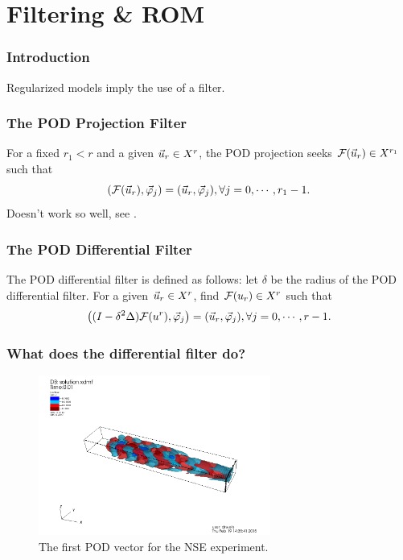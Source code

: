 \documentclass[mathserif]{beamer}
\begin{document}
\section{Filtering \& ROM}
    \begin{frame}
        \frametitle{Introduction}
        Regularized models imply the use of a filter.
    \end{frame}

    \begin{frame}
        \frametitle{The POD Projection Filter}
        For a fixed \(r_1 < r\) and a given \(\vec{u}_r \in X^r\), the POD projection
        seeks \(\mathcal{F}(\vec{u}_r) \in X^{r_1}\) such that
        \begin{equation}
            (\mathcal{F}(\vec{u}_r), \vec{\varphi}_j) = (\vec{u}_r, \vec{\varphi}_j), \forall j = 0, \cdots, r_1
            - 1.
        \end{equation}
        \pause
        Doesn't work so well, see \cite{regrompreprint}.
    \end{frame}

    \begin{frame}
        \frametitle{The POD Differential Filter}
        The POD differential filter is defined as follows: let \(\delta\) be the
        radius of the POD differential filter. For a given \(\vec{u}_r \in X^r\),
        find \(\mathcal{F}(u_r) \in X^r\) such that
        \begin{equation}
            \left((I - \delta^2 \Delta) \mathcal{F}(u^r), \vec{\varphi}_j\right)
            = (\vec{u}_r, \vec{\varphi}_j), \forall j = 0, \cdots, r - 1.
        \end{equation}
    \end{frame}

    \begin{frame}
        \frametitle{What does the differential filter do?}
        \begin{figure}
            \includegraphics[width=3in]{../Pictures/NSE/pod-vector-1.png}
            \caption{The first POD vector for the NSE experiment.}
        \end{figure}
    \end{frame}
\end{document}
